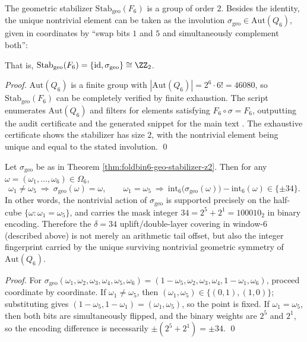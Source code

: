 \begin{theorem}\label{thm:foldbin6-geo-stabilizer-z2}
The geometric stabilizer \(\mathrm{Stab}_{\mathrm{geo}}(F_6)\) is a group of order \(2\).
Besides the identity, the unique nontrivial element can be taken as the involution
\(\sigma_{\mathrm{geo}}\in\mathrm{Aut}(Q_6)\), given in coordinates by ``swap bits \(1\) and \(5\) and simultaneously complement both'':

That is,
\(
\mathrm{Stab}_{\mathrm{geo}}(F_6)=\{\mathrm{id},\sigma_{\mathrm{geo}}\}\cong\ZZ_2
\).
\end{theorem}
\begin{proof}
\(\mathrm{Aut}(Q_6)\) is a finite group with \(|\mathrm{Aut}(Q_6)|=2^6\cdot 6!=46080\), so \(\mathrm{Stab}_{\mathrm{geo}}(F_6)\) can be completely verified by finite exhaustion.
The script \texttt{} enumerates \(\mathrm{Aut}(Q_6)\) and filters for elements satisfying \(F_6\circ\sigma=F_6\), outputting the audit certificate
\texttt{} and the generated snippet for the main text
\texttt{}.
The exhaustive certificate shows the stabilizer has size \(2\), with the nontrivial element being unique and equal to the stated involution. \qed
\end{proof}

\begin{corollary}[Geometric origin of \texorpdfstring{$34=100010_2$}{34=100010_2}: half-cube support and \texorpdfstring{$\pm 34$}{+-34} offset]\label{cor:foldbin6-geo-mask-34}
Let \(\sigma_{\mathrm{geo}}\) be as in Theorem \ref{thm:foldbin6-geo-stabilizer-z2}.
Then for any \(\omega=(\omega_1,\dots,\omega_6)\in\Omega_6\),
\[
\omega_1\neq \omega_5\ \Longrightarrow\ \sigma_{\mathrm{geo}}(\omega)=\omega,
\qquad
\omega_1=\omega_5\ \Longrightarrow\ \mathrm{int}_6\!\bigl(\sigma_{\mathrm{geo}}(\omega)\bigr)-\mathrm{int}_6(\omega)\in\{\pm 34\}.
\]
In other words, the nontrivial action of \(\sigma_{\mathrm{geo}}\) is supported precisely on the half-cube \(\{\omega:\omega_1=\omega_5\}\), and carries the mask integer \(34=2^5+2^1=100010_2\) in binary encoding.
Therefore the \(\delta=34\) uplift/double-layer covering in window-6 (described above) is not merely an arithmetic tail offset, but also the integer fingerprint carried by the unique surviving nontrivial geometric symmetry of \(\mathrm{Aut}(Q_6)\).
\end{corollary}
\begin{proof}
For \(\sigma_{\mathrm{geo}}(\omega_1,\omega_2,\omega_3,\omega_4,\omega_5,\omega_6)=(1-\omega_5,\omega_2,\omega_3,\omega_4,1-\omega_1,\omega_6)\), proceed coordinate by coordinate.
If \(\omega_1\neq\omega_5\), then \((\omega_1,\omega_5)\in\{(0,1),(1,0)\}\); substituting gives \((1-\omega_5,1-\omega_1)=(\omega_1,\omega_5)\), so the point is fixed.
If \(\omega_1=\omega_5\), then both bits are simultaneously flipped, and the binary weights are \(2^5\) and \(2^1\), so the encoding difference is necessarily \(\pm(2^5+2^1)=\pm 34\).
\qed
\end{proof}

